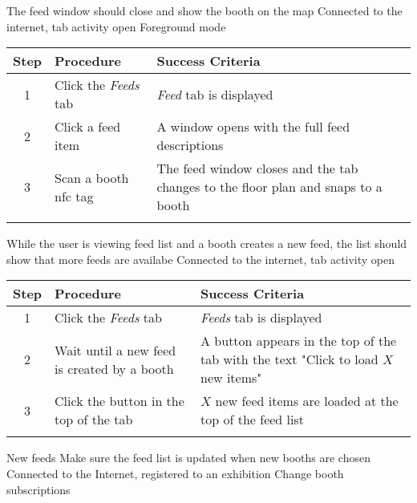 \testcase
{\casethree}
{The feed window should close and show the booth on the map}
{Connected to the internet, tab activity open}
{Foreground mode}

\begin{center}
\begin{tabular}{| c | p{4.6cm} | p{4.6cm} |}
\hline
\textbf{Step} & \textbf{Procedure} & \textbf{Success Criteria}\\
\hline
1 & Click the \textit{Feeds} tab & \textit{Feed} tab is displayed\\
\hline
2 & Click a feed item & A window opens with the full feed descriptions\\
\hline
3 & Scan a booth \ac{nfc} tag & The feed window closes and the tab changes to the floor plan and snaps to a booth\\
\hline
\multicolumn{3}{c}{} \\%
\end{tabular}
\end{center}

\testcase
{\casefour}
{While the user is viewing feed list and a booth creates a new feed, the list should show that more feeds are availabe}
{Connected to the internet, tab activity open}
{}

\begin{center}
\begin{tabular}{| c | p{4.6cm} | p{4.6cm} |}
\hline
\textbf{Step} & \textbf{Procedure} & \textbf{Success Criteria}\\
\hline
1 & Click the \textit{Feeds} tab & \textit{Feeds} tab is displayed\\
\hline
2 & Wait until a new feed is created by a booth & A button appears in the top of the tab with the text "Click to load $X$ new items"\\
\hline
3 & Click the button in the top of the tab & $X$ new feed items are loaded at the top of the feed list\\
\hline
\multicolumn{3}{c}{} \\%
\end{tabular}
\end{center}

\newcommand{\casefive}{New feeds}
\newcommand{\casesix}{Register a user}
\newcommand{\caseseven}{Snap to booth}
\newcommand{\caseeight}{Navigate to booth}
\newcommand{\casenine}{Register new exhibition}

\testcase
{\casefive}
{Make sure the feed list is updated when new booths are chosen}
{Connected to the Internet, registered to an exhibition}
{Change booth subscriptions}

